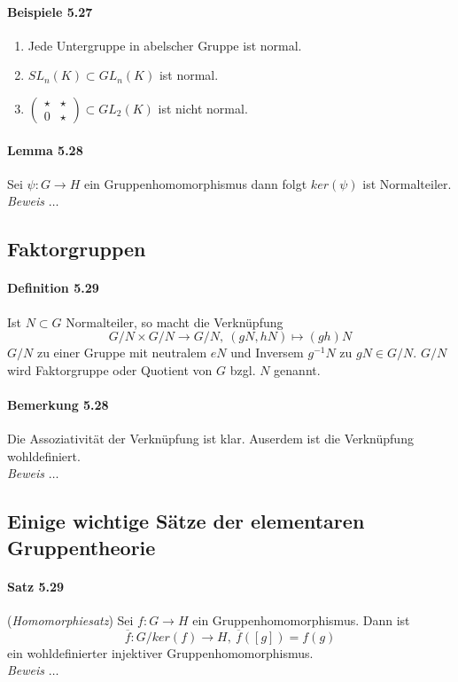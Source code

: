 \documentclass{scrartcl}
\begin{document}
\paragraph{Beispiele 5.27}
\begin{enumerate}
\item Jede Untergruppe in abelscher Gruppe ist normal.
\item $SL_n(K) \subset GL_n(K)$ ist normal.
\item $
  \begin{pmatrix}
    \star & \star \\
    0 & \star
  \end{pmatrix} \subset GL_2(K)
  $ ist nicht normal.
\end{enumerate}

\paragraph{Lemma 5.28} Sei $\psi: G \to H$ ein Gruppenhomomorphismus dann folgt
$ker(\psi)$ ist Normalteiler. \\
\textit{Beweis} $\dots$

\subsection{Faktorgruppen}
\label{subsec:faktorgruppen}

\paragraph{Definition 5.29} Ist $N \subset G$ Normalteiler, so macht die
Verknüpfung
\[
  G/N \times G/N \to G/N,~(gN, hN) \mapsto (gh)N
\]
$G/N$ zu einer Gruppe mit neutralem $eN$ und Inversem $g^{-1}N$ zu $gN \in G/N$.
$G/N$ wird Faktorgruppe oder Quotient von $G$ bzgl. $N$ genannt.
\paragraph{Bemerkung 5.28} Die Assoziativität der Verknüpfung ist klar. Auserdem
ist die Verknüpfung wohldefiniert. \\
\textit{Beweis} $\dots$

\subsection{Einige wichtige Sätze der elementaren Gruppentheorie}
\label{subsec:einigewichtigesaetzederelementaregruppentheorie}

\paragraph{Satz 5.29} (\textit{Homomorphiesatz}) Sei $f: G \to H$ ein
Gruppenhomomorphismus. Dann ist
\[
  \overline{f}: G/ker(f) \to H,~\overline{f}([g]) = f(g)
\]
ein wohldefinierter injektiver Gruppenhomomorphismus. \\
\textit{Beweis} $\dots$
\end{document}
